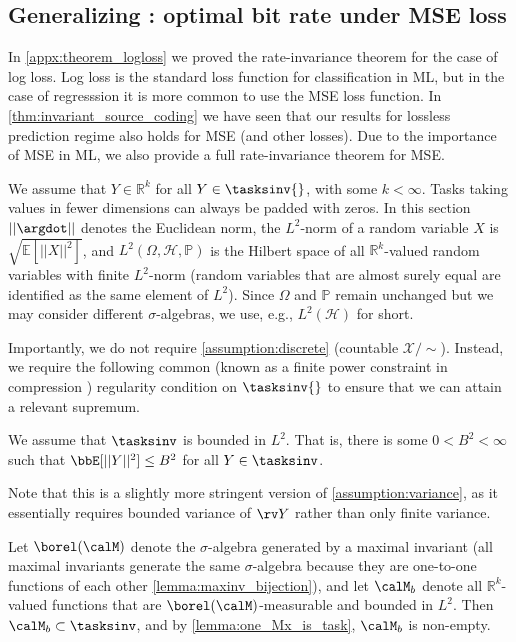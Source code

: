 \documentclass[final]{article}
\begin{document}
\subsection{Generalizing \texorpdfstring{}{Theorem 2}: optimal bit rate under MSE loss}
\label{appx:theorem_mse}


In \cref{appx:theorem_logloss} we proved the rate-invariance theorem for the case of log loss.
Log loss is the standard loss function for classification in ML, but in the case of regresssion it is more common to use the MSE loss function.
In \cref{thm:invariant_source_coding} we have seen that our results for lossless prediction regime also holds for MSE (and other losses).
Due to the importance of MSE in ML, we also provide a full rate-invariance theorem for MSE. 

We assume that $Y \in \mathbb{R}^k$ for all $Y \in \tasksinv{}$, with some $k < \infty$. Tasks taking values in fewer dimensions can always be padded with zeros. In this section $||\argdot ||$ denotes the Euclidean norm, the $L^2$-norm of a random variable $X$ is $\sqrt{\mathbb{E}[||X||^2]}$, and $L^2(\Omega, \mathcal{H}, \mathbb{P})$ is the Hilbert space of all $\mathbb{R}^k$-valued random variables with finite $L^2$-norm (random variables that are almost surely equal are identified as the same element of $L^2$). Since $\Omega$ and $\mathbb{P}$ remain unchanged but we may consider different $\sigma$-algebras, we use, e.g., $L^2(\mathcal{H})$ for short.

Importantly, we do not require \cref{assumption:discrete} (countable $\mathcal{X}/\sim$). 
Instead, we require the following common (known as a finite power constraint in compression \cite{cover_elements_2006}) regularity condition on $\tasksinv{}$ to ensure that we can attain a relevant supremum.

\begin{assumption}[$L^2$-boundedness]\label{assumption:l2:bounded}
    We assume that $\tasksinv$ is bounded in $L^2$. That is, there is some $0<B^2<\infty$ such that $\bbE[||Y||^2] \leq B^2$ for all $Y \in \tasksinv$.
\end{assumption}

Note that this is a slightly more stringent version of \cref{assumption:variance}, as it essentially requires bounded variance of $\rv Y$ rather than only finite variance.

Let $\borel(\calM)$ denote the $\sigma$-algebra generated by a maximal invariant (all maximal invariants generate the same $\sigma$-algebra because they are one-to-one functions of each other \cref{lemma:maxinv_bijection}), and let $\calM_b$ denote all $\mathbb{R}^k$-valued functions that are $\borel(\calM)$-measurable and bounded in $L^2$. Then $\calM_b \subset \tasksinv$, and by \cref{lemma:one_Mx_is_task}, $\calM_b$ is non-empty. 
\end{document}
